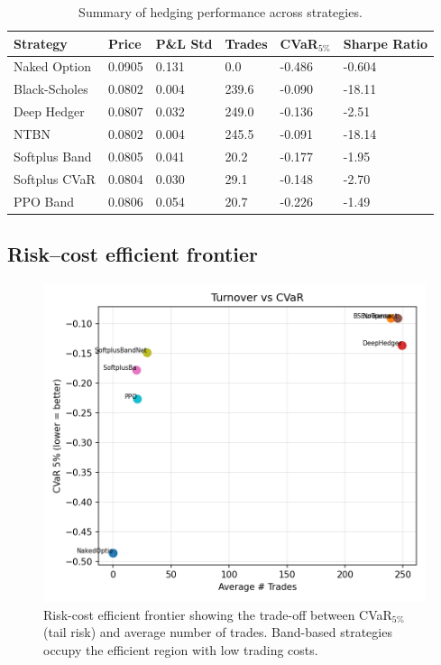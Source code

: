 \documentclass[11pt,letterpaper]{article}
\begin{document}
\begin{table}[h]
  \centering
  \caption{Summary of hedging performance across strategies.}
  \label{tab:results}
  \begin{tabularx}{\linewidth}{@{}lXXXXX@{}}
    \toprule
    Strategy & Price & P\&L Std & Trades & CVaR$_{5\%}$ & Sharpe Ratio \\
    \midrule
    Naked Option & 0.0905 & 0.131 & 0.0 & -0.486 & -0.604 \\
    Black-Scholes & 0.0802 & 0.004 & 239.6 & -0.090 & -18.11 \\
    Deep Hedger & 0.0807 & 0.032 & 249.0 & -0.136 & -2.51 \\
    NTBN & 0.0802 & 0.004 & 245.5 & -0.091 & -18.14 \\
    Softplus Band & 0.0805 & 0.041 & 20.2 & -0.177 & -1.95 \\
    Softplus CVaR & 0.0804 & 0.030 & 29.1 & -0.148 & -2.70 \\
    PPO Band & 0.0806 & 0.054 & 20.7 & -0.226 & -1.49 \\
    \bottomrule
  \end{tabularx}
\end{table}

\subsection{Risk--cost efficient frontier}
\begin{figure}[h]
  \centering
  \includegraphics[width=0.8\linewidth]{figures/trade_cvar_scatter.png}
  \caption{Risk-cost efficient frontier showing the trade-off between CVaR$_{5\%}$ (tail risk) and average number of trades. Band-based strategies occupy the efficient region with low trading costs.}
  \label{fig:frontier}
\end{figure}
\end{document}
